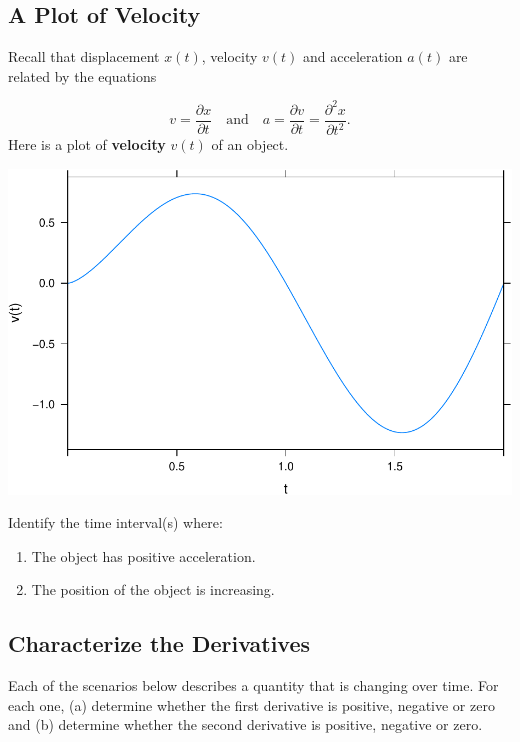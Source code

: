 \documentclass[
]{book}
\providecommand{\tightlist}{%
  \setlength{\itemsep}{0pt}\setlength{\parskip}{0pt}}
\begin{document}
\hypertarget{a-plot-of-velocity}{%
\subsection{A Plot of Velocity}\label{a-plot-of-velocity}}

Recall that displacement \(x(t)\), velocity \(v(t)\) and acceleration \(a(t)\) are related by the equations

\[  v = \frac{\partial x}{\partial t} \quad \mbox{and} \quad a = \frac{\partial v}{\partial t} = \frac{\partial^2 x}{\partial t^2}.\]
Here is a plot of \textbf{velocity} \(v(t)\) of an object.

\includegraphics{_bookdown_files/math135_handbook_files/figure-latex/unnamed-chunk-87-1.pdf}

Identify the time interval(s) where:

\begin{enumerate}
\def\labelenumi{\arabic{enumi}.}
\tightlist
\item
  The object has positive acceleration.
\item
  The position of the object is increasing.
\end{enumerate}

\hypertarget{characterize-the-derivatives}{%
\subsection{Characterize the Derivatives}\label{characterize-the-derivatives}}

Each of the scenarios below describes a quantity that is changing over time. For each one, (a) determine whether the first derivative is positive, negative or zero and (b) determine whether the second derivative is positive, negative or zero.
\end{document}
